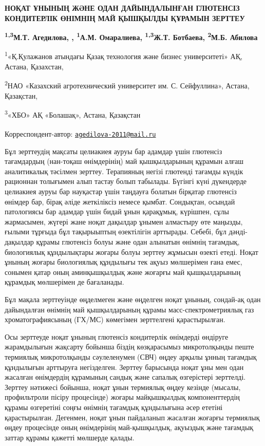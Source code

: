 
{\bfseries НОҚАТ ҰНЫНЫҢ ЖӘНЕ ОДАН ДАЙЫНДАЛЫНҒАН ГЛЮТЕНСІЗ КОНДИТЕРЛІК
ӨНІМНІҢ МАЙ ҚЫШҚЫЛДЫ ҚҰРАМЫН ЗЕРТТЕУ}

{\bfseries \textsuperscript{1,3}М.Т. Агедилова\textsuperscript{\envelope }, ,
\textsuperscript{1}А.М. Омаралиева, \textsuperscript{1,3}Ж.Т. Ботбаева,
\textsuperscript{2}М.Б. Абилова}

\textsuperscript{1}«Қ.Қулажанов атындағы Қазақ технология және бизнес
университеті» АҚ, Астана, Қазахстан,

\textsuperscript{2}НАО «Казахский агротехнический университет им. С.
Сейфуллина», Астана, Қазақстан,

\textsuperscript{3}«ХБО» АҚ «Болашақ», Астана, Қазақстан


{\bfseries \textsuperscript{\envelope }}Корреспондент-автор:
\href{mailto:agedilova-2011@mail.ru}{\nolinkurl{agedilova-2011@mail.ru}}

Бұл зерттеудің мақсаты целиакиея ауруы бар адамдар үшін глютенсіз
тағамдардың (нан-тоқаш өнімдерінің) май қышқылдарының құрамын алғаш
аналитикалық тәсілмен зерттеу. Терапияның негізі глютенді тағамды күндік
рационнан толығымен алып тастау болып табылады. Бүгінгі күні дүкендерде
целиакиея ауруы бар науқастар үшін таңдауға болатын бірқатар глютенсіз
өнімдер бар, бірақ әліде жеткіліксіз немесе қымбат. Сондықтан, осындай
патологиясы бар адамдар үшін бидай ұнын қарақұмық, күрішпен, сұлы
жармасымен, жүгері жане ноқат дақылдар ұнымен алмастыру өте маңызды,
ғылыми тұрғыда бұл тақырыыптың өзектілігін арттырады. Себебі, бұл дәнді-
дақылдар құрамы глютенсіз болуы және одан алынатын өнімнің тағамдық,
биологиялық құндылықтары жоғары болуы зерттеу жұмысын өзекті етеді.
Ноқат ұнының жоғары биологиялық құндылығы тек ақуыз мөлшерімен ғана
емес, сонымен қатар оның аминқышқылдық және жоғарғы май қышқылдарының
құрамдық мөлшерімен де бағаланады.

Бұл мақала зерттеуінде өңделмеген және өңделген ноқат ұнының, сондай-ақ
одан дайындалған өнімнің май қышқылдарының құрамы масс-спектрометриялық
газ хроматографиясының (ГХ/МС) көмегімен зерттелгені қарастырылған.

Осы зерттеуде ноқат ұнының глютенсіз кондитерлік өнімдерді өндіруге
жарамдылығын жақсарту бойынша біздің көзқарасымыз микротолқынды пеште
термиялық микротолқынды сәулеленумен (СВЧ) өңдеу арқылы ұнның тағамдық
құндылығын арттыруға негізделген. Зерттеу барысында ноқат ұны мен одан
жасалған өнімдердің құрамының сандық және сапалық өзгерістері зерттелді.
Зерттеу нәтижесі бойынша, ноқат ұнын термиялық өңдеу кезінде (мысалы,
профильтроли пісіру процесінде) жоғары майқышқылдық компоненттердің
құрамы өзгеретіні соңғы өнімнің тағамдық құндылығына әсер ететіні
қарастырылған. Дегенмен, ноқат ұнын пайдаланып жасалған жоғарғы
термиялық өңдеу процесінде оның өнімдерінің май-қышқылдық, ақуыздық және
тағамдық заттар құрамы қажетті мөлшерде қалады.

